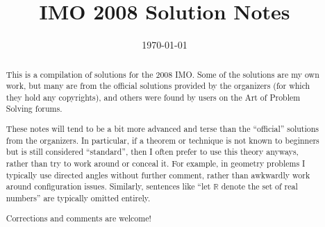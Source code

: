 \documentclass[11pt]{scrartcl}
\title{IMO 2008 Solution Notes}
\date{\today}
\begin{document}
\maketitle

\begin{abstract}
This is a compilation of solutions
for the 2008 IMO.
Some of the solutions are my own work,
but many are from the official solutions provided by the organizers
(for which they hold any copyrights),
and others were found by users on the Art of Problem Solving forums.

These notes will tend to be a bit more advanced and terse than the ``official''
solutions from the organizers.
In particular, if a theorem or technique is not known to beginners
but is still considered ``standard'', then I often prefer to
use this theory anyways, rather than try to work around or conceal it.
For example, in geometry problems I typically use directed angles
without further comment, rather than awkwardly work around configuration issues.
Similarly, sentences like ``let $\mathbb{R}$ denote the set of real numbers''
are typically omitted entirely.

Corrections and comments are welcome!
\end{abstract}

\tableofcontents
\newpage

\addtocounter{section}{-1}
\end{document}

